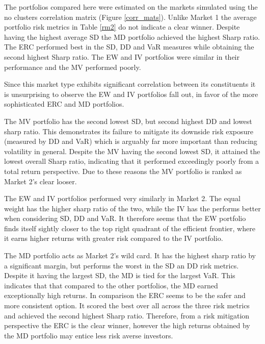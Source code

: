 \documentclass[11pt,preprint, authoryear]{elsarticle}
\numberwithin{equation}{section}
\numberwithin{figure}{section}
\numberwithin{table}{section}
\begin{document}
The portfolios compared here were estimated on the markets simulated
using the no clusters correlation matrix (Figure \ref{corr_mats}).
Unlike Market 1 the average portfolio risk metrics in Table \ref{rm2} do
not indicate a clear winner. Despite having the highest average SD the
MD portfolio achieved the highest Sharp ratio. The ERC performed best in
the SD, DD and VaR measures while obtaining the second highest Sharp
ratio. The EW and IV portfolios were similar in their performance and
the MV performed poorly.

Since this market type exhibits significant correlation between its
constituents it is unsurprising to observe the EW and IV portfolios fall
out, in favor of the more sophisticated ERC and MD portfolios.

The MV portfolio has the second lowest SD, but second highest DD and
lowest sharp ratio. This demonstrates its failure to mitigate its
downside risk exposure (measured by DD and VaR) which is arguably far
more important than reducing volatility in general. Despite the MV
having the second lowest SD, it attained the lowest overall Sharp ratio,
indicating that it performed exceedingly poorly from a total return
perspective. Due to these reasons the MV portfolio is ranked as Market
2's clear looser.

The EW and IV portfolios performed very similarly in Market 2. The equal
weight has the higher sharp ratio of the two, while the IV has the
performs better when considering SD, DD and VaR. It therefore seems that
the EW portfolio finds itself sightly closer to the top right quadrant
of the efficient frontier, where it earns higher returns with greater
risk compared to the IV portfolio.

The MD portfolio acts as Market 2's wild card. It has the highest sharp
ratio by a significant margin, but performs the worst in the SD an DD
risk metrics. Despite it having the largest SD, the MD is tied for the
largest VaR. This indicates that that compared to the other portfolios,
the MD earned exceptionally high returns. In comparison the ERC seems to
be the safer and more consistent option. It scored the best over all
across the three risk metrics and achieved the second highest Sharp
ratio. Therefore, from a risk mitigation perspective the ERC is the
clear winner, however the high returns obtained by the MD portfolio may
entice less risk averse investors.
\end{document}
